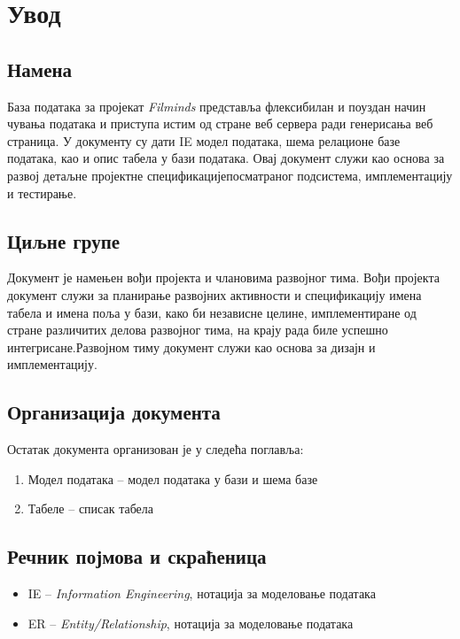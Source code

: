 \section{Увод}

\subsection{Намена}

База података за пројекат \textit{Filminds} представља флексибилан и поуздан начин чувања 
података и приступа истим од стране веб сервера ради генерисања веб страница.
У документу су дати IE модел података, шема релационе базе података, као и опис
табела у бази података. Овај документ служи као основа за развој детаљне пројектне 
спецификацијепосматраног подсистема, имплементацију и тестирање. 

\subsection{Циљне групе}

Документ је намењен вођи пројекта и члановима развојног тима. Вођи пројекта
документ служи за планирање развојних активности и спецификацију имена табела и имена
поља у бази, како би независне целине, имплементиране од стране различитих делова
развојног тима, на крају рада биле успешно интегрисане.Развојном тиму документ служи 
као основа за дизајн и имплементацију.

\subsection{Организација документа}

Остатак документа организован је у следећа поглавља:
\begin{enumerate}
  \item Модел података – модел података у бази и шема базе
  \item Табеле – списак табела
\end{enumerate}

\subsection{Речник појмова и скраћеница}

\begin{itemize}
  \item IE – \textit{Information Engineering}, нотација за моделовање података
  \item ER – \textit{Entity/Relationship}, нотација за моделовање података
\end{itemize}

